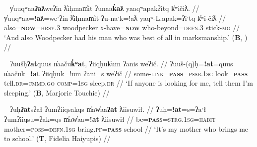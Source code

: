 \begin{comment}
\ex \label{ex:doubleatl2}
\begingl
\glpreamble ʔuḥʔaƛ tiic̓̌ap̓aƛ hałmiiḥa. //
\gla ʔuḥ=!aƛ tiic=!ap=!aƛ hałmiiḥa  //
\glb be=\textsc{now} alive.\textsc{dr}=\textsc{caus}=\textsc{now} drown.\textsc{cv} //
\glft `He made him alive from drowning.' (\textbf{C}, \textit{tupaat} Julia Lucas) //
\endgl
\xe
\end{comment}

\ex~ \label{ex:doubleatlyuuqwaa}
\begingl
\glpreamble y̓uuqʷaa\textbf{ʔaƛ}weʔin ƛ̓iḥmam̓it ʔunaa\textbf{k̓aƛ} yaaqʷapakʔitq k̓ʷičiƛ. //
\gla y̓uuqʷaa=\textbf{!aƛ}=weˑʔin ƛ̓iḥmam̓it ʔu-naˑk=!aƛ yaqʷ-L.apak=ʔiˑtq k̓ʷi-čiƛ  //
\glb also=\textbf{\textsc{now}}=\textsc{hrsy.3} woodpecker \textsc{x}-have=\textbf{\textsc{now}} who-beyond=\textsc{defn.3} stick-\textsc{mo} //
\glft `And also Woodpecker had his man who was best of all in marksmanship.' (\textbf{B}, \citet[p.~50]{sapir1939}) //
\endgl
\xe


\begin{comment}
\ex~ \label{ex:doubleap}
\begingl
\glpreamble hišuk̓ap̓aƛ witkʷaaʔap ʔin wikmaḥsap̓aƛ, ḥaakʷaaƛsma. //
\gla hišuk=!ap=!aƛ witkʷaa=!ap ʔin wik-maḥsa=!ap=!aƛ, ḥaakʷaaƛ-sma  //
\glb all=\textsc{caus}=\textsc{now} destroy=\textsc{caus} \textsc{comp} \textsc{neg}-want.to=\textsc{caus}=\textsc{caus} young.woman-protective.of //
\glft `Everyone destroyed the wharf because they wanted her to marry, they were stingy of the girl.' (\textbf{C}, \textit{tupaat} Julia Lucas) //
\endgl
\xe
\end{comment}


\ex~ \label{ex:doubleatuush}
\begingl
\glpreamble ʔuušḥ\textbf{ʔat}quus n̓aaču\textbf{k̓ʷat}, ʔiiqḥuk̓um ʔanis weʔič. //
\gla ʔuuš-(q)ḥ=\textbf{!at}=quus n̓aačuk=\textbf{!at} ʔiiqḥuk=!um ʔani=s weʔič  //
\glb some-\textsc{link}=\textbf{\textsc{pass}}=\textsc{pssb.1sg} look=\textbf{\textsc{pass}} tell.\textsc{dr}=\textsc{cmmd.go} \textsc{comp}=\textsc{1sg} sleep.\textsc{dr} //
\glft `If anyone is looking for me, tell them I'm sleeping.' (\textbf{B}, Marjorie Touchie) //
\endgl
\xe

\ex~ \label{ex:doubleatuh}
\begingl
\glpreamble ʔuḥ\textbf{ʔat}sʔał ʔumʔiiqsakqs m̓aw̓aa\textbf{ʔat} ƛiisuwił. //
\gla ʔuḥ=\textbf{!at}=s=ʔaˑł ʔumʔiiqsu=ʔak=qs m̓aw̓aa=\textbf{!at} ƛiisuwił  //
\glb be=\textbf{\textsc{pass}}=\textsc{strg.1sg}=\textsc{habit} mother=\textsc{poss}=\textsc{defn.1sg} bring.\textsc{pf}=\textbf{\textsc{pass}} school //
\glft `It's my mother who brings me to school.' (\textbf{T}, Fidelia Haiyupis) //
\endgl
\xe


